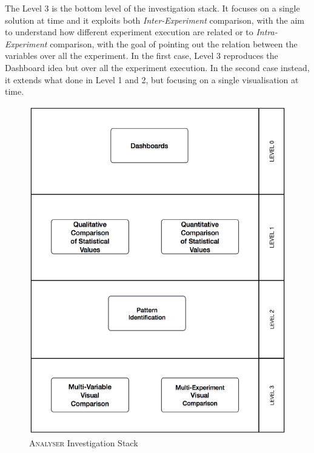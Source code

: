 The Level 3 is the bottom level of the investigation stack. It focuses on a single solution at time and it exploits both \textit{Inter-Experiment} comparison, with the aim to understand how different experiment execution are related or to  \textit{Intra-Experiment} comparison, with the goal of pointing out the relation between the variables over all the experiment. In the first case, Level 3 reproduces the Dashboard idea but over all the experiment execution. In the second case instead, it extends what done in Level 1 and 2, but focusing on a single visualisation at time.

\begin{figure}[htb]
  \centering
	\includegraphics[width=\linewidth]{images/analysis-method}
	\caption{\textsc{Analyser} Investigation Stack}
  	\label{fig:analysis-method}
\end{figure}



